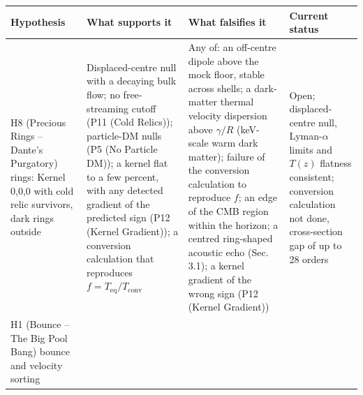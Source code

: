 \documentclass[
  11pt,
]{article}
\begin{document}
\begin{longtable}[]{@{}llll@{}}
\toprule
\begin{minipage}[b]{0.22\columnwidth}\raggedright
Hypothesis\strut
\end{minipage} & \begin{minipage}[b]{0.22\columnwidth}\raggedright
What supports it\strut
\end{minipage} & \begin{minipage}[b]{0.22\columnwidth}\raggedright
What falsifies it\strut
\end{minipage} & \begin{minipage}[b]{0.22\columnwidth}\raggedright
Current status\strut
\end{minipage}\tabularnewline
\midrule
\endhead
\begin{minipage}[t]{0.22\columnwidth}\raggedright
H8 (Precious Rings -- Dante's Purgatory) rings: Kernel 0,0,0 with cold
relic survivors, dark rings outside\strut
\end{minipage} & \begin{minipage}[t]{0.22\columnwidth}\raggedright
Displaced-centre null with a decaying bulk flow; no free-streaming
cutoff (P11 (Cold Relics)); particle-DM nulls (P5 (No Particle DM)); a
kernel flat to a few percent, with any detected gradient of the
predicted sign (P12 (Kernel Gradient)); a conversion calculation that
reproduces \(f = T_{\text{eq}}/T_{\text{conv}}\)\strut
\end{minipage} & \begin{minipage}[t]{0.22\columnwidth}\raggedright
Any of: an off-centre dipole above the mock floor, stable across shells;
a dark-matter thermal velocity dispersion above \(\gamma/R\) (keV-scale
warm dark matter); failure of the conversion calculation to reproduce
\(f\); an edge of the CMB region within the horizon; a centred
ring-shaped acoustic echo (Sec. 3.1); a kernel gradient of the wrong
sign (P12 (Kernel Gradient))\strut
\end{minipage} & \begin{minipage}[t]{0.22\columnwidth}\raggedright
Open; displaced-centre null, Lyman-\(\alpha\) limits and \(T(z)\)
flatness consistent; conversion calculation not done, cross-section gap
of up to 28 orders\strut
\end{minipage}\tabularnewline
\begin{minipage}[t]{0.22\columnwidth}\raggedright
H1 (Bounce -- The Big Pool Bang) bounce and velocity sorting\strut
\end{minipage} & \begin{minipage}[t]{0.22\columnwidth}\raggedright

\end{minipage}
\end{longtable}
\end{document}
